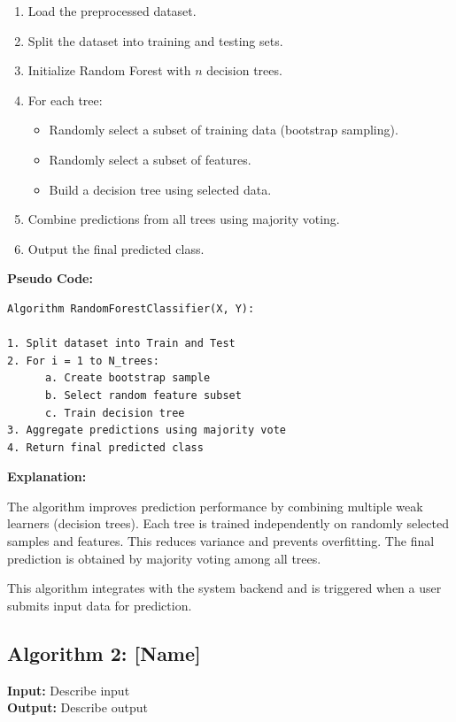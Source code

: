 \begin{enumerate}
    \item Load the preprocessed dataset.
    \item Split the dataset into training and testing sets.
    \item Initialize Random Forest with $n$ decision trees.
    \item For each tree:
    \begin{itemize}
        \item Randomly select a subset of training data (bootstrap sampling).
        \item Randomly select a subset of features.
        \item Build a decision tree using selected data.
    \end{itemize}
    \item Combine predictions from all trees using majority voting.
    \item Output the final predicted class.
\end{enumerate}

\textbf{Pseudo Code:}

\begin{verbatim}
Algorithm RandomForestClassifier(X, Y):

1. Split dataset into Train and Test
2. For i = 1 to N_trees:
      a. Create bootstrap sample
      b. Select random feature subset
      c. Train decision tree
3. Aggregate predictions using majority vote
4. Return final predicted class
\end{verbatim}

\textbf{Explanation:}

The algorithm improves prediction performance by combining multiple 
weak learners (decision trees). Each tree is trained independently 
on randomly selected samples and features. This reduces variance and 
prevents overfitting. The final prediction is obtained by majority 
voting among all trees.

This algorithm integrates with the system backend and is triggered 
when a user submits input data for prediction.

\subsection{Algorithm 2: [Name]}

\textbf{Input:} Describe input \\
\textbf{Output:} Describe output \\

